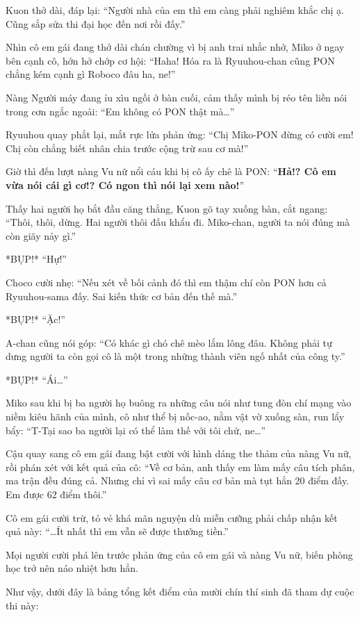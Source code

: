 \documentclass[../main.tex]{subfiles}
\begin{document}
Kuon thở dài, đáp lại: ``Người nhà của em thì em càng phải nghiêm khắc chị ạ. Cũng sắp sửa thi đại học đến nơi rồi đấy.''

Nhìn cô em gái đang thở dài chán chường vì bị anh trai nhắc nhở, Miko ở ngay bên cạnh cô, hớn hở chớp cơ hội: ``Haha! Hóa ra là Ryuuhou-chan cũng PON chẳng kém cạnh gì Roboco đâu ha, ne!''

Nàng Người máy đang ỉu xìu ngồi ở bàn cuối, cảm thấy mình bị réo tên liền nói trong cơn ngắc ngoải: ``Em không có PON thật mà\dots''

Ryuuhou quay phắt lại, mắt rực lửa phản ứng: ``Chị Miko-PON đừng có cười em! Chị còn chẳng biết nhân chia trước cộng trừ sau cơ mà!''

Giờ thì đến lượt nàng Vu nữ nổi cáu khi bị cô ấy chê là PON: ``\textbf{Hả!? Cô em vừa nói cái gì cơ!? Có ngon thì nói lại xem nào!}''

Thấy hai người họ bắt đầu căng thẳng, Kuon gõ tay xuống bàn, cắt ngang: ``Thôi, thôi, dừng. Hai người thôi đấu khẩu đi. Miko-chan, người ta nói đúng mà còn giãy nảy gì.''

*BỤP!* ``Hự!''

Choco cười nhẹ: ``Nếu xét về bối cảnh đó thì em thậm chí còn PON hơn cả Ryuuhou-sama đấy. Sai kiến thức cơ bản đến thế mà.''

*BỤP!* ``Ặc!''

A-chan cũng nói góp: ``Có khác gì chó chê mèo lắm lông đâu. Không phải tự dưng người ta còn gọi cô là một trong những thành viên ngố nhất của công ty.''

*BỤP!* ``Ái\dots''

Miko sau khi bị ba người họ buông ra những câu nói như tung đòn chí mạng vào niềm kiêu hãnh của mình, cô như thể bị nốc-ao, nằm vật vờ xuống sàn, run lẩy bẩy: ``T-Tại sao ba người lại có thể làm thế với tôi chứ, ne\dots''

Cậu quay sang cô em gái đang bật cười với hình dáng the thảm của nàng Vu nữ, rồi phán xét với kết quả của cô: ``Về cơ bản, anh thấy em làm mấy câu tích phân, ma trận đều đúng cả. Nhưng chỉ vì sai mấy câu cơ bản mà tụt hẳn 20 điểm đấy. Em được 62 điểm thôi.''

Cô em gái cười trừ, tỏ vẻ khá mãn nguyện dù miễn cưỡng phải chấp nhận kết quả này: ``\dots Ít nhất thì em vẫn sẽ được thưởng tiền.''

Mọi người cười phá lên trước phản ứng của cô em gái và nàng Vu nữ, biến phòng học trở nên náo nhiệt hơn hẳn.

\ct

Như vậy, dưới đây là bảng tổng kết điểm của mười chín thí sinh đã tham dự cuộc thi này:
\end{document}

